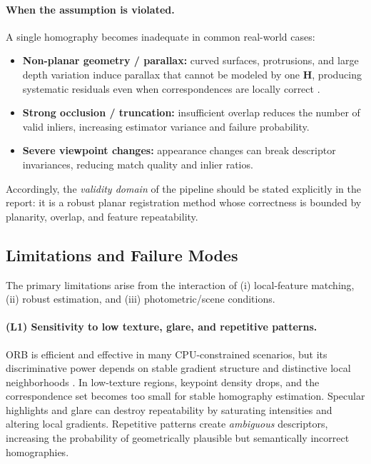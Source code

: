 \paragraph{When the assumption is violated.}
A single homography becomes inadequate in common real-world cases:
\begin{itemize}
  \item \textbf{Non-planar geometry / parallax:} curved surfaces, protrusions, and large depth variation induce parallax that cannot be modeled by one $\mathbf{H}$, producing systematic residuals even when correspondences are locally correct \citep{HartleyZisserman2004}.
  \item \textbf{Strong occlusion / truncation:} insufficient overlap reduces the number of valid inliers, increasing estimator variance and failure probability.
  \item \textbf{Severe viewpoint changes:} appearance changes can break descriptor invariances, reducing match quality and inlier ratios.
\end{itemize}

Accordingly, the \emph{validity domain} of the pipeline should be stated explicitly in the report: it is a robust planar registration method whose correctness is bounded by planarity, overlap, and feature repeatability.

\subsection{Limitations and Failure Modes}
\label{subsec:limitations}
The primary limitations arise from the interaction of (i) local-feature matching, (ii) robust estimation, and (iii) photometric/scene conditions.

\paragraph{(L1) Sensitivity to low texture, glare, and repetitive patterns.}
ORB is efficient and effective in many CPU-constrained scenarios, but its discriminative power depends on stable gradient structure and distinctive local neighborhoods \citep{Rublee2011ORB}. In low-texture regions, keypoint density drops, and the correspondence set becomes too small for stable homography estimation. Specular highlights and glare can destroy repeatability by saturating intensities and altering local gradients. Repetitive patterns create \emph{ambiguous} descriptors, increasing the probability of geometrically plausible but semantically incorrect homographies.

